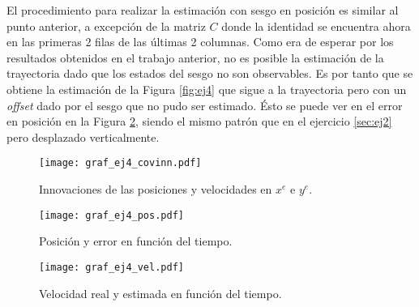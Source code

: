 
	El procedimiento para realizar la estimación con sesgo en posición es similar al punto anterior, a excepción de la matriz $C$ donde la identidad se encuentra ahora en las primeras 2 filas de las últimas 2 columnas. Como era de esperar por los resultados obtenidos en el trabajo anterior, no es posible la estimación de la trayectoria dado que los estados del sesgo no son observables. Es por tanto que se obtiene la estimación de la Figura \ref{fig:ej4} que sigue a la trayectoria pero con un \emph{offset} dado por el sesgo que no pudo ser estimado. Ésto se puede ver en el error en posición en la Figura \ref{fig:4pos}, siendo el mismo patrón que en el ejercicio \ref{sec:ej2} pero desplazado verticalmente.


\begin{figure}[H]
\centering
\texttt{[image: graf\_ej4\_covinn.pdf]}
\caption{Innovaciones de las posiciones y velocidades en $x^e$ e $y^e$.}
\label{fig:4covinn} 
\end{figure}


\pagebreak


\vspace*{\fill}
\begin{figure}[H]
\centering
\texttt{[image: graf\_ej4\_pos.pdf]}
\caption{Posición y error en función del tiempo.}
\label{fig:4pos} 
\end{figure}
\vspace*{\fill}

\pagebreak


\vspace*{\fill}
\begin{figure}[H]
\centering
\texttt{[image: graf\_ej4\_vel.pdf]}
\caption{Velocidad real y estimada en función del tiempo.}
\label{fig:4vel} 
\end{figure}
\vspace*{\fill}


\pagebreak
{}

